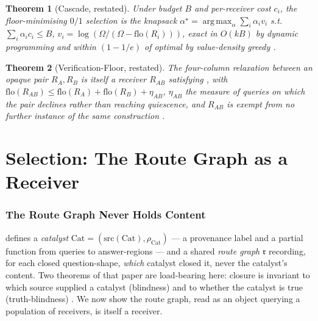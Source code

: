 \documentclass[11pt,twocolumn,a4paper]{article}
\theoremstyle{rdm}
\newtheorem{theorem}{Theorem}[section]
\theoremstyle{definition}
\theoremstyle{remark}
\newcommand{\Om}{\Omega}
\newcommand{\flo}{\mathrm{flo}}
\newcommand{\Rec}{R}
\newcommand{\rg}{\mathfrak{r}}
\newcommand{\Cat}{\mathrm{Cat}}
\newcommand{\argmax}{\operatorname*{arg\,max}}
\begin{document}
\begin{theorem}[Cascade, restated]
\label{thm:cascade-recap}
Under budget $B$ and per-receiver cost $c_i$, the floor-minimising $0/1$
selection is the knapsack
$\alpha^\star=\argmax_\alpha\sum_i\alpha_i v_i$ s.t.\
$\sum_i\alpha_ic_i\le B$, $v_i=\log(\Om/(\Om-\flo(\Rec_i)))$, exact in
$O(kB)$ by dynamic programming and within $(1-1/e)$ of optimal by
value-density greedy
\citep[Thm.~6.4]{sachikonye-accountable-compilation}.
\end{theorem}

\begin{theorem}[Verification-Floor, restated]
\label{thm:verif-floor-recap}
The four-column relaxation between an opaque pair $\Rec_A,\Rec_B$ is itself
a receiver $\Rec_{AB}$ satisfying \Cref{def:receiver-recap}, with
$\flo(\Rec_{AB})\le\flo(\Rec_A)+\flo(\Rec_B)+\eta_{AB}$, $\eta_{AB}$ the
measure of queries on which the pair declines rather than reaching
quiescence, and $\Rec_{AB}$ is exempt from no further instance of the same
construction
\citep[Def.~9.1, Prop.~9.1, Thm.~9.1, Cor.~9.1]{sachikonye-accountable-compilation}.
\end{theorem}

\part{Selection: The Route Graph as a Receiver}
\label{part:selection}

\section{The Route Graph Never Holds Content}
\label{sec:closure}

\citet{sachikonye-federated-context-closure} defines a \emph{catalyst}
$\Cat=(\mathrm{src}(\Cat),\rho_\Cat)$ — a provenance label and a partial
function from queries to answer-regions — and a shared \emph{route graph}
$\rg$ recording, for each closed question-shape, \emph{which} catalyst
closed it, never the catalyst's content. Two theorems of that paper are
load-bearing here: closure is invariant to which source supplied a catalyst
(blindness) and to whether the catalyst is true (truth-blindness)
\citep[Thm.~4.2, 4.3]{sachikonye-federated-context-closure}. We now show the
route graph, read as an object querying a population of receivers, is
itself a receiver.
\end{document}
